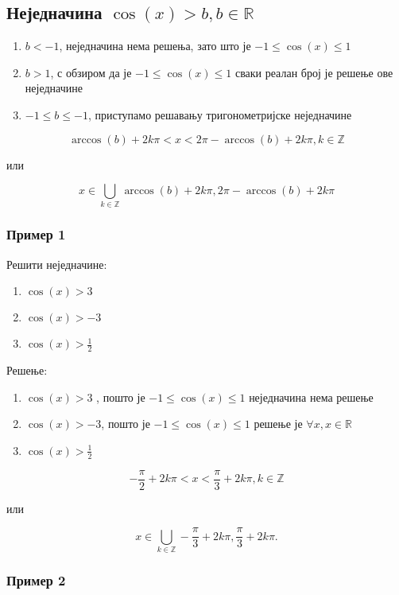 \documentclass[../diplomski.tex]{subfiles}
\begin{document}
\subsection{Неједначина $\cos(x)>b,b\in\mathbb{R}$}

\begin{enumerate}[label=\alph*)]
\item $b<-1$, неједначина нема решења, зато што је $-1\leq\cos(x)\leq1$
\item $b>1$, с обзиром да је $-1\leq\cos(x)\leq1$ сваки реалан број је решење ове неједначине
\item $-1\leq b\leq-1$, приступамо решавању тригонометријске неједначине
\end{enumerate}

\[\arccos(b)+2k\pi<x<2\pi-\arccos(b)+2k\pi,k\in\mathbb{Z}\]
\centerline{или}
\[x\in\bigcup_{k\in\mathbb{Z}}\arccos(b)+2k\pi,2\pi-\arccos(b)+2k\pi\]

\subsubsection{Пример 1}

Решити неједначине:

\begin{enumerate}[label=\alph*)]
\item $\cos(x)>3$
\item $\cos(x)>-3$
\item $\cos(x)>\frac{1}{2}$
\end{enumerate}

Решење:

\begin{enumerate}[label=\alph*)]
\item $\cos(x)>3$ , пошто је $-1\leqslant\cos(x)\leqslant1$ неједначина нема решење
\item $\cos(x)>-3$, пошто је $-1\leqslant\cos(x)\leqslant1$ решење је $\forall x,x\in\mathbb{R}$
\item $\cos(x)>\frac{1}{2}$
\end{enumerate}

\[-\frac{\pi}{2}+2k\pi<x<\frac{\pi}{3}+2k\pi,k\in\mathbb{Z}\]
\centerline{или}
\[x\in\bigcup_{k\in\mathbb{Z}}-\frac{\pi}{3}+2k\pi,\frac{\pi}{3}+2k\pi.\]


\subsubsection{Пример 2}
\end{document}
